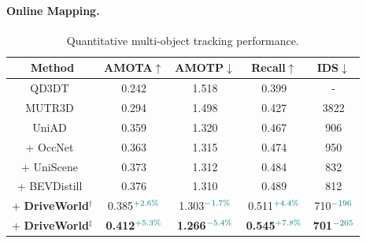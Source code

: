 \paragraph{Online Mapping.}	
\begin{table}[t]
	\centering
	\resizebox{0.5\textwidth}{!}
	{
		\begin{tabular}{c|c|c|c|c}
			\toprule
			\textbf{Method}&\textbf{AMOTA}$\uparrow$&\textbf{AMOTP}$\downarrow$&\textbf{Recall}$\uparrow$&\textbf{IDS}$\downarrow$\\
			\midrule
			QD3DT~\cite{qd3dt} &0.242&1.518&0.399&- \\
			MUTR3D~\cite{mutr3d} &0.294&1.498&0.427&3822 \\
			\midrule
			UniAD~\cite{uniad} &0.359&1.320&0.467&906 \\
			+ OccNet~\cite{occnet} &0.363&1.315&0.474&950 \\
			+ UniScene~\cite{uniscene} &0.373&1.312&0.484&832 \\
			+ BEVDistill~\cite{bevdistill} &0.376&1.310&0.489&812 \\
			\midrule
			\rowcolor{gray!10}+ \textbf{DriveWorld}$^{\dagger }$    &0.385$^{\textcolor{teal} {+2.6\%}}$&1.303$^{\textcolor{teal} {-1.7\%}}$&0.511$^{\textcolor{teal} {+4.4\%}}$&710$^{\textcolor{teal} {-196}}$ \\
			\rowcolor{gray!10}+ \textbf{DriveWorld}$^{\ddagger }$  &\bf0.412$^{\textcolor{teal} {+5.3\%}}$&\bf1.266$^{\textcolor{teal} {-5.4\%}}$&\bf0.545$^{\textcolor{teal} {+7.8\%}}$&\bf701$^{\textcolor{teal} {-205}}$\\
			\bottomrule
		\end{tabular}
	}
	\caption{Quantitative multi-object tracking performance.}
	\label{tab:mot}
\end{table}

